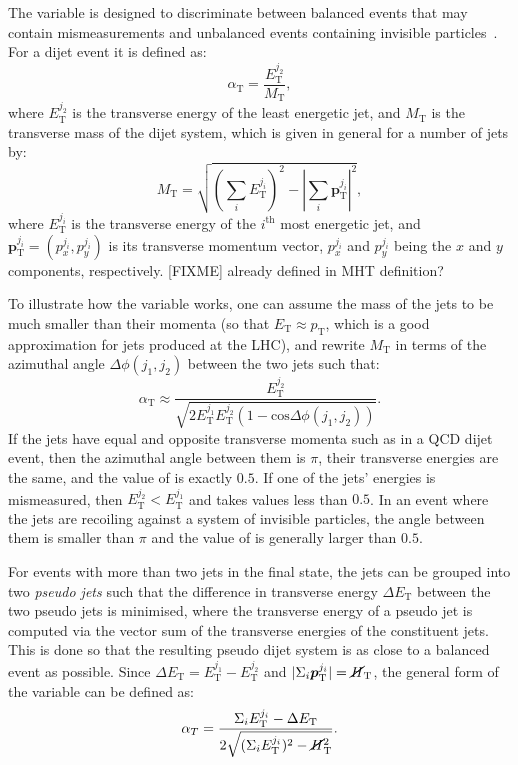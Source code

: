 The \alphat variable is designed to discriminate between balanced events that 
may contain mismeasurements and unbalanced events containing invisible 
particles~\cite{alpha-variable}. For a dijet event it is defined as:
\begin{equation}
\alpha_\mathrm T = \frac{E_\mathrm{T}^{j_2}}{M_\mathrm{T}}, 
\end{equation} 
where $E_\mathrm{T}^{j_2}$ is the transverse energy of the least energetic jet, 
and $M_\mathrm{T}$ is the transverse mass of the dijet system, which is given 
in general for a number of jets by:
\begin{equation}
M_\mathrm{T} = \sqrt{\left(\sum_{i}E_{\mathrm T}^{j_i}\right)^2 - 
\left|\sum_{i}\bm{p}_\mathrm{T}^{j_i}\right|^2},
\end{equation}
where $E_{\mathrm T}^{j_i}$ is the transverse energy of the $i^\mathrm{th}$ 
most energetic jet, and 
$\bm{p}_\mathrm{T}^{j_i} = (p_x^{j_i}, p_y^{j_i})$ is its 
transverse momentum vector, $p_x^{j_i}$ and $p_y^{j_i}$ being the $x$ and $y$ 
components, respectively. [FIXME] already defined in MHT definition?

To illustrate how the \alphat variable works, one can assume the mass of the 
jets to be much smaller than their momenta (so that $E_\mathrm T \approx 
p_\mathrm T$, which is a good approximation for jets produced at the LHC), and 
rewrite $M_\mathrm T$ in terms of the 
azimuthal angle $\Delta\phi(j_1,j_2)$ between the two jets such that:
\begin{equation}
\alpha_\mathrm T \approx \frac{E_\mathrm{T}^{j_2}}{\sqrt{2E_{\mathrm 
T}^{j_1}E_{\mathrm T}^{j_2}(1-\mathrm{cos}\Delta\phi(j_1,j_2))}}.
\end{equation}
If the jets have equal and opposite transverse momenta such as in a QCD dijet 
event, then the azimuthal angle between them is $\pi$, their transverse 
energies are the same, and the value of \alphat is exactly $0.5$. If one of the 
jets' energies is mismeasured, then $E_\mathrm{T}^{j_2} < E_\mathrm{T}^{j_1}$ 
and \alphat takes values less than $0.5$. In an event where the jets are 
recoiling against a system of invisible particles, the angle between them is 
smaller than $\pi$ and the value of \alphat is generally larger than $0.5$.

For events with more than two jets in the final state, the jets can be grouped 
into two \textit{pseudo jets} such that the difference in transverse energy 
$\Delta E_\mathrm T$ between the two pseudo jets is minimised, where the 
transverse energy of a pseudo jet is computed via the vector sum of the 
transverse energies of the constituent jets. This is done so that the resulting 
pseudo dijet system is as close to a balanced event as possible. Since $\Delta 
E_\mathrm T = E_\mathrm{T}^{j_1} - E_\mathrm{T}^{j_2}$ and 
$|\Sigma_i\bm{p}_\mathrm{T}^{j_i}| = \mbox{$\cancel{H}_\text{T}$}$, the general form of the \alphat 
variable can be defined as:
\begin{equation}
\alpha_T=\frac{\Sigma_i E_\mathrm{T}^{j_i}-\Delta 
E_\mathrm{T}}{2\sqrt{(\Sigma_i E_\mathrm{T}^{j_i})^2-\cancel{H}_\mathrm{T}^2}}.
\end{equation}

